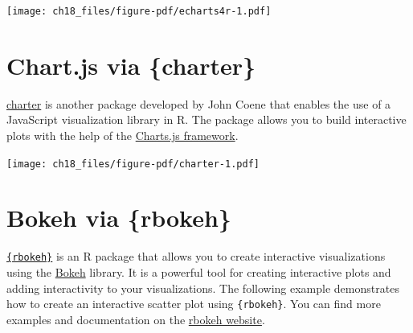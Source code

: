 \documentclass[
  letterpaper,
]{scrbook}
\newenvironment{Shaded}{\begin{snugshade}}{\end{snugshade}}
\newcommand{\AttributeTok}[1]{\textcolor[rgb]{0.40,0.45,0.13}{#1}}
\newcommand{\DecValTok}[1]{\textcolor[rgb]{0.68,0.00,0.00}{#1}}
\newcommand{\DocumentationTok}[1]{\textcolor[rgb]{0.37,0.37,0.37}{\textit{#1}}}
\newcommand{\FunctionTok}[1]{\textcolor[rgb]{0.28,0.35,0.67}{#1}}
\newcommand{\NormalTok}[1]{\textcolor[rgb]{0.00,0.23,0.31}{#1}}
\newcommand{\OtherTok}[1]{\textcolor[rgb]{0.00,0.23,0.31}{#1}}
\newcommand{\SpecialCharTok}[1]{\textcolor[rgb]{0.37,0.37,0.37}{#1}}
\newcommand{\StringTok}[1]{\textcolor[rgb]{0.13,0.47,0.30}{#1}}
\begin{document}
\texttt{[image: ch18\_files/figure-pdf/echarts4r-1.pdf]}

\section{Chart.js via \{charter\}}\label{chart.js-via-charter}

\href{https://github.com/JohnCoene/charter}{charter} is another package
developed by John Coene that enables the use of a JavaScript
visualization library in R. The package allows you to build interactive
plots with the help of the \href{https://www.chartjs.org/}{Charts.js
framework}.

\begin{Shaded}
\end{Shaded}

\texttt{[image: ch18\_files/figure-pdf/charter-1.pdf]}

\section{Bokeh via \{rbokeh\}}\label{bokeh-via-rbokeh}

\href{https://hafen.github.io/rbokeh/}{\texttt{\{rbokeh\}}} is an R
package that allows you to create interactive visualizations using the
\href{https://bokeh.org/}{Bokeh} library. It is a powerful tool for
creating interactive plots and adding interactivity to your
visualizations. The following example demonstrates how to create an
interactive scatter plot using \texttt{\{rbokeh\}}. You can find more
examples and documentation on the
\href{https://hafen.github.io/rbokeh/}{rbokeh website}.
\end{document}
